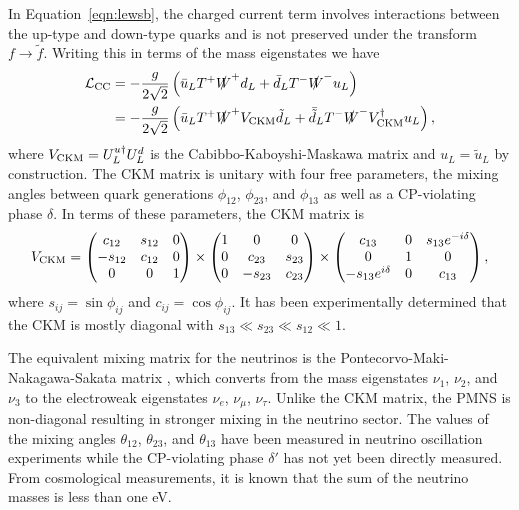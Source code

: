 In Equation~\ref{eqn:lewsb}, the charged current term involves interactions between the up-type and down-type quarks and is not preserved under the transform $f \rightarrow \tilde f$.
Writing this in terms of the mass eigenstates we have
\begin{align}
  \mathcal{L}_{\text{CC}} %
  & = - \frac{g}{2\sqrt{2}} \left( \bar u_L T^+ \slashed W^+ d_L + \bar d_L T^- \slashed W^- u_L \right) \nonumber \\
  & = - \frac{g}{2\sqrt{2}} \left( \bar{u}_L  T^+ \slashed W^+ \vckm \tilde{d}_L + \bar{\tilde{d}}_L T^- \slashed W^- \vckm^\dagger u_L \right),
\end{align}
where $V_{\text{CKM}} = U^{u\dagger}_L U^d_L$ is the Cabibbo-Kaboyshi-Maskawa matrix and $u_L = \tilde{u}_L$ by construction.
The CKM matrix is unitary with four free parameters, the mixing angles between quark generations $\phi_{12}$, $\phi_{23}$, and $\phi_{13}$ as well as a CP-violating phase $\delta$.
In terms of these parameters, the CKM matrix is
\begin{equation}
  V_{\text{CKM}} = \begin{pmatrix} c_{12} & s_{12} & 0 \\ - s_{12} & c_{12} & 0 \\ 0 & 0 & 1 \end{pmatrix}
  \times \begin{pmatrix} 1 & 0 & 0  \\ 0 & c_{23} & s_{23} \\ 0 & - s_{23} & c_{23} \end{pmatrix}
  \times \begin{pmatrix} c_{13} & 0 & s_{13} e^{-i\delta} \\ 0 & 1 & 0 \\ -s_{13} e^{i\delta} & 0 & c_{13} \end{pmatrix},
\end{equation}
where $s_{ij} = \sin \phi_{ij}$ and $c_{ij} = \cos \phi_{ij}$.
It has been experimentally determined that the CKM is mostly diagonal with $s_{13} \ll s_{23} \ll s_{12} \ll 1$. 

The equivalent mixing matrix for the neutrinos is the Pontecorvo-Maki-Nakagawa-Sakata matrix \upmns, which  converts from the mass eigenstates $\nu_1$, $\nu_2$, and $\nu_3$ to the electroweak eigenstates $\nu_e$, $\nu_\mu$, $\nu_\tau$.
Unlike the CKM matrix, the PMNS is non-diagonal resulting in stronger mixing in the neutrino sector.
The values of the mixing angles $\theta_{12}$, $\theta_{23}$, and $\theta_{13}$ have been measured in neutrino oscillation experiments while the CP-violating phase $\delta'$ has not yet been directly measured.
From cosmological measurements, %
it is known that the sum of the neutrino masses is less than one eV. 

